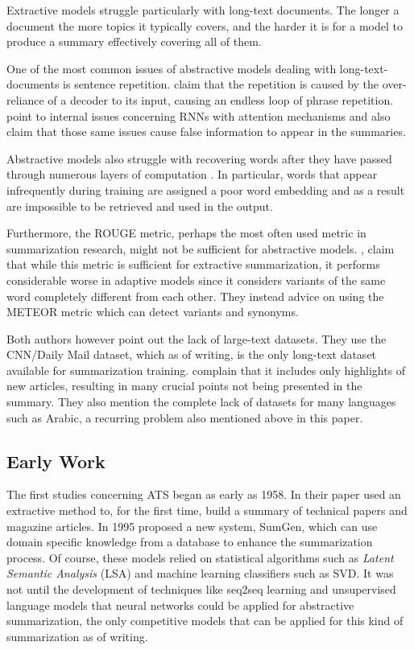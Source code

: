 \documentclass{article}
\begin{document}
	Extractive models struggle particularly with long-text documents\cite{xiao}. The longer a document the more topics it typically covers, and the harder it is for a model to produce a summary effectively covering all of them.\par
	
	One of the most common issues of abstractive models dealing with long-text-documents is sentence repetition. \textcite{abigail} claim that the repetition is caused by the over-reliance of a decoder to its input, causing an endless loop of phrase repetition. \textcite{suleiman} point to internal issues concerning RNNs with attention mechanisms and also claim that those same issues cause false information to appear in the summaries. \par
	
	Abstractive models also struggle with recovering words after they have passed through numerous layers of computation \cite{abigail}. In particular, words that appear infrequently during training are assigned a poor word embedding and as a result are impossible to be retrieved and used in the output. \par 
	
	Furthermore, the ROUGE metric, perhaps the most often used metric in summarization research, might not be sufficient for abstractive models. \textcite{suleiman}, claim that while this metric is sufficient for extractive summarization, it performs considerable worse in adaptive models since it considers variants of the same word completely different from each other. They instead advice on using the METEOR metric which can detect variants and synonyms. \par
	
	Both authors however point out the lack of large-text datasets. They use the CNN/Daily Mail dataset, which as of writing, is the only long-text dataset available for summarization training. \textcite{suleiman} complain that it includes only highlights of new articles, resulting in many crucial points not being presented in the summary. They also mention the complete lack of datasets for many languages such as Arabic, a recurring problem also mentioned above in this paper. \par
	
	
	\subsection{Early Work}
	
	The first studies concerning ATS began as early as 1958. In their paper \textcite{luhn} used an extractive method to, for the first time, build a summary  of technical papers and magazine articles. In 1995 \textcite{maybury} proposed a new system, SumGen, which can use domain specific knowledge from a database to enhance the summarization process. Of course, these models relied on statistical algorithms such as \textit{Latent Semantic Analysis} (LSA) and machine learning classifiers such as SVD. It was not until the development of techniques like seq2seq learning and unsupervised language models that neural networks could be applied for abstractive summarization, the only competitive models that can be applied for this kind of summarization as of writing.
	
\end{document}
